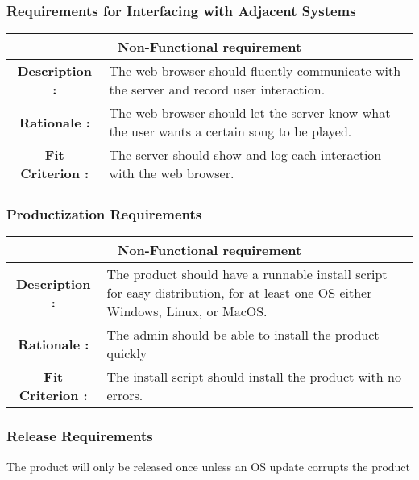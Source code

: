 \documentclass[12pt, titlepage]{article}
\begin{document}
\subsubsection{Requirements for Interfacing with Adjacent Systems}
\begin{center}
\begin{table}[H]
\begin{tabularx}{\textwidth}{| c X |}
\hline
\multicolumn{2}{|c|}{\textbf{Non-Functional requirement}}\\
\hline
\textbf{Description : } &The web browser should fluently communicate with the server and record user interaction.\\
\hline
\textbf{Rationale : } & The web browser should let the server know what the user wants a certain song to be played. \\
\hline
\textbf{Fit Criterion : } & The server should show and log each interaction with the web browser. \\
\hline
\end{tabularx}
\end{table}
\end{center}
\subsubsection{Productization Requirements}
\begin{center}
\begin{table}[H]
\begin{tabularx}{\textwidth}{| c X |}
\hline
\multicolumn{2}{|c|}{\textbf{Non-Functional requirement}}\\
\hline
\textbf{Description : } &The product should have a runnable install script for easy distribution, for at least one OS either Windows, Linux, or MacOS.\\
\hline
\textbf{Rationale : } & The admin should be able to install the product quickly \\
\hline
\textbf{Fit Criterion : } & The install script should install the product with no errors. \\
\hline
\end{tabularx}
\end{table}
\end{center}
\subsubsection{Release Requirements}
The product will only be released once unless an OS update corrupts the product
\end{document}

